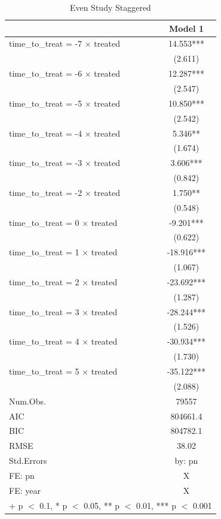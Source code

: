 \documentclass[
  12pt,
]{article}
\begin{document}
\begin{table}

\caption{\label{tab:table-4}Even Study Staggered}
\centering
\begin{tabular}[t]{lc}
\toprule
  & Model 1\\
\midrule
time\_to\_treat = -7 × treated & 14.553***\\
 & (2.611)\\
time\_to\_treat = -6 × treated & 12.287***\\
 & (2.547)\\
time\_to\_treat = -5 × treated & 10.850***\\
 & (2.542)\\
time\_to\_treat = -4 × treated & 5.346**\\
 & (1.674)\\
time\_to\_treat = -3 × treated & 3.606***\\
 & (0.842)\\
time\_to\_treat = -2 × treated & 1.750**\\
 & (0.548)\\
time\_to\_treat = 0 × treated & -9.201***\\
 & (0.622)\\
time\_to\_treat = 1 × treated & -18.916***\\
 & (1.067)\\
time\_to\_treat = 2 × treated & -23.692***\\
 & (1.287)\\
time\_to\_treat = 3 × treated & -28.244***\\
 & (1.526)\\
time\_to\_treat = 4 × treated & -30.934***\\
 & (1.730)\\
time\_to\_treat = 5 × treated & -35.122***\\
 & (2.088)\\
\midrule
Num.Obs. & 79557\\
AIC & 804661.4\\
BIC & 804782.1\\
RMSE & 38.02\\
Std.Errors & by: pn\\
FE: pn & X\\
FE: year & X\\
\bottomrule
\multicolumn{2}{l}{\rule{0pt}{1em}+ p $<$ 0.1, * p $<$ 0.05, ** p $<$ 0.01, *** p $<$ 0.001}\\
\end{tabular}
\end{table}
\end{document}
